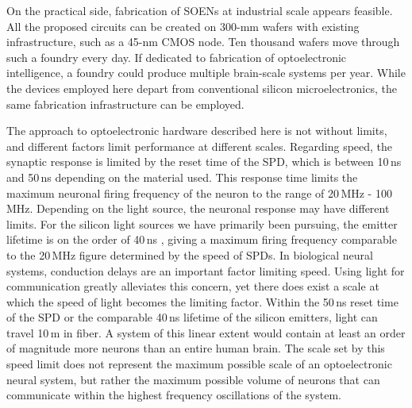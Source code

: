 \documentclass[twocolumn]{article}
\begin{document}
On the practical side, fabrication of SOENs at industrial scale appears feasible. All the proposed circuits can be created on 300-mm wafers with existing infrastructure, such as a 45-nm CMOS node. Ten thousand wafers move through such a foundry every day. If dedicated to fabrication of optoelectronic intelligence, a foundry could produce multiple brain-scale systems per year. While the devices employed here depart from conventional silicon microelectronics, the same fabrication infrastructure can be employed. 

The approach to optoelectronic hardware described here is not without limits, and different factors limit performance at different scales. Regarding speed, the synaptic response is limited by the reset time of the SPD, which is between 10\,ns and 50\,ns depending on the material used. This response time limits the maximum neuronal firing frequency of the neuron to the range of 20\,MHz - 100\,MHz. Depending on the light source, the neuronal response may have different limits. For the silicon light sources we have primarily been pursuing, the emitter lifetime is on the order of 40\,ns \cite{buta2020}, giving a maximum firing frequency comparable to the 20\,MHz figure determined by the speed of SPDs. In biological neural systems, conduction delays are an important factor limiting speed. Using light for communication greatly alleviates this concern, yet there does exist a scale at which the speed of light becomes the limiting factor. Within the 50\,ns reset time of the SPD or the comparable 40\,ns lifetime of the silicon emitters, light can travel 10\,m in fiber. A system of this linear extent would contain at least an order of magnitude more neurons than an entire human brain. The scale set by this speed limit does not represent the maximum possible scale of an optoelectronic neural system, but rather the maximum possible volume of neurons that can communicate within the highest frequency oscillations of the system.
\end{document}
